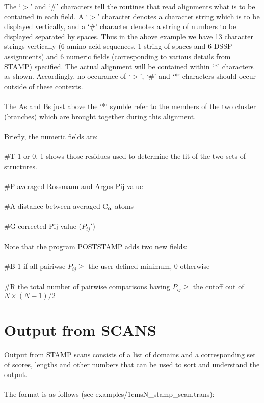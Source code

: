 The `$>$' and `\#' characters tell the routines that read alignments
what is to be contained in each field.  A `$>$' character denotes a
character string which is to be displayed vertically, and a `\#'
character denotes a string of numbers to be displayed separated by
spaces.  Thus in the above example we have 13 character strings
vertically (6 amino acid sequences, 1 string of spaces and 6 DSSP
assignments) and 6 numeric fields (corresponding to various details
from STAMP) specified.  The actual alignment will be contained
within `*' characters as shown.  Accordingly, no occurance of `$>$',
`\#' and `*' characters should occur outside of these contexts.\\
\\
The As and Bs just above the `*' symble 
refer to the members of the two cluster (branches) 
which are brought together during this alignment.\\
\\
Briefly, the numeric fields are:\\
\\
\#T  1 or 0, 1 shows those residues used to 
         determine the fit of the two sets of structures.\\
\\
\#P  averaged Rossmann and Argos Pij value\\
\\
\#A  distance between averaged ${\rm C}_{\alpha}$ atoms\\
\\
\#G  corrected Pij value ($P_{ij}{\prime}$)\\
\\
Note that the program POSTSTAMP adds two new fields:\\
\\
\#B  $1$ if all pairiwse $P_{ij} \geq$  the user defined minimum, $0$ otherwise\\
\\
\#R  the total number of pairwise comparisons having $P_{ij} \geq $ the cutoff out of $N\times(N-1)/2$

\section{Output from SCANS}

Output from STAMP scans consists of a list of domains and a 
corresponding set of scores, lengths and other numbers that can be 
used to sort and understand the output.\\
\\
The format is as follows (see examples/1cmsN\_stamp\_scan.trans):\\

